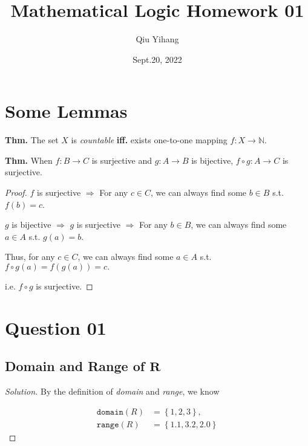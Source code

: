\documentclass{article}
\title{\textbf{Mathematical Logic Homework 01}}
\author{Qiu Yihang}
\date{Sept.20, 2022}
\newcommand{\set}[1]{\left\{#1\right\}}
\newenvironment{solution}{\begin{proof}[\noindent\it Solution]}{\end{proof}}
\begin{document}
\maketitle

\setcounter{section}{-1}
\section{Some Lemmas}

\vspace{1em}
\textbf{Thm.} The set $X$ is \textit{countable} \textbf{iff.} exists one-to-one mapping $f:X\to\mathbb{N}$. 

\vspace{1em}\hspace{-1.8em}
\textbf{Thm.} When $f:B\to C$ is surjective and $g:A\to B$ is bijective, $f\circ g:A\to C$ is surjective.

\vspace{-0.5em}
\begin{proof}
    $f$ is surjective $\Rightarrow$ For any $c\in C$, we can always find some $b\in B$ s.t. $f(b)=c$.

    \hspace{1.3em}
    $g$ is bijective $\Rightarrow$ $g$ is surjective $\Rightarrow$ For any $b\in B$, we can always find some $a\in A$ s.t. $g(a)=b$.

    \hspace{1.1em}
    Thus, for any $c\in C$, we can always find some $a\in A$ s.t. $f\circ g(a) = f(g(a)) = c.$

    \hspace{1.3em}
    i.e. $f\circ g$ is surjective.    
\end{proof}

\vspace{3em}
\section{Question 01}
\vspace{1em}

\subsection{Domain and Range of $\boldsymbol{R}$}
\vspace{1em}
\begin{solution}
    By the definition of \textit{domain} and \textit{range}, we know
    
    \vspace{-3.em}
    \begin{align*}
        \mathtt{domain}(R) &= \set{1,2,3},\\\mathtt{range}(R) &= \set{1.1,3.2,2.0}
    \end{align*}

\vspace{-3.6em}
\end{solution}
\end{document}
